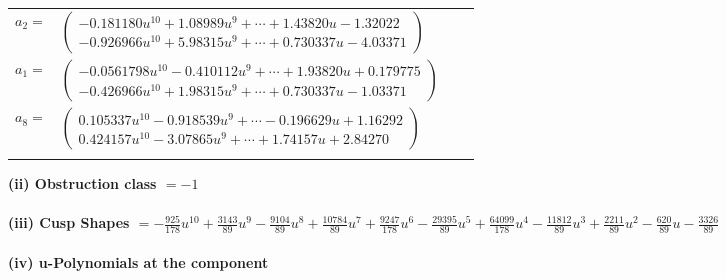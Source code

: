 \documentclass[1p]{elsarticle_modified}
\theoremstyle{definition}
\begin{document}
\begin{tabular}{m{7pt} m{180pt} m{7pt} m{180pt} }
\flushright $a_{2}=$&$\begin{pmatrix}-0.181180 u^{10}+1.08989 u^{9}+\cdots+1.43820 u-1.32022\\-0.926966 u^{10}+5.98315 u^{9}+\cdots+0.730337 u-4.03371\end{pmatrix}$ \\
\flushright $a_{1}=$&$\begin{pmatrix}-0.0561798 u^{10}-0.410112 u^{9}+\cdots+1.93820 u+0.179775\\-0.426966 u^{10}+1.98315 u^{9}+\cdots+0.730337 u-1.03371\end{pmatrix}$ \\
\flushright $a_{8}=$&$\begin{pmatrix}0.105337 u^{10}-0.918539 u^{9}+\cdots-0.196629 u+1.16292\\0.424157 u^{10}-3.07865 u^{9}+\cdots+1.74157 u+2.84270\end{pmatrix}$\\&\end{tabular}
\flushleft \textbf{(ii) Obstruction class $= -1$}\\~\\
\flushleft \textbf{(iii) Cusp Shapes $= -\frac{925}{178} u^{10}+\frac{3143}{89} u^9-\frac{9104}{89} u^8+\frac{10784}{89} u^7+\frac{9247}{178} u^6-\frac{29395}{89} u^5+\frac{64099}{178} u^4-\frac{11812}{89} u^3+\frac{2211}{89} u^2-\frac{620}{89} u-\frac{3326}{89}$}\\~\\
\newpage\renewcommand{\arraystretch}{1}
\flushleft \textbf{(iv) u-Polynomials at the component}\newline \\
\end{document}
